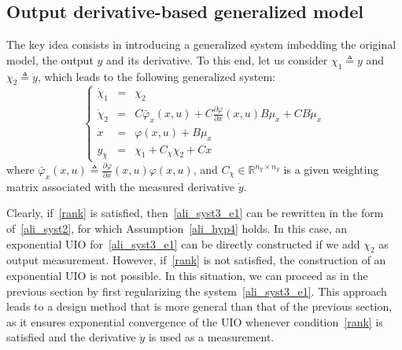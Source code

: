 \subsection{Output derivative-based generalized model}\label{output_derivative_model}
The key idea consists in introducing a generalized system imbedding the original model, the output $y$ and its derivative. To this end, let us consider $\chi_{1} \triangleq y$ and $\chi_{2} \triangleq \dot{y}$, which leads to the following generalized system:
\begin{equation}\label{ali_syst3_e1}
\left\{
\begin{array}{rcl}
\dot{\chi}_{1} & = & \chi_{2} 
\\
\dot{\chi}_{2} & = & C  \bar{\varphi}_{x}(x,u)  + C \frac{\partial \varphi}{\partial x}(x,u) B \mu_{x} + CB \dot{\mu}_{x}
\\ 
\dot{x} & = &  \varphi(x,u) + B \mu_{x} \\
y_{\chi} & = &  \chi_{1} + C_{\chi} \chi_{2} + C x
\end{array}
\right.
\end{equation}
where $\bar{\varphi}_{x}(x,u) \triangleq \frac{\partial \varphi}{\partial x}(x,u) \varphi(x,u)$, and $C_{\chi} \in\mathbb{R}^{n_y\times n_y}$ is a given weighting matrix associated with the measured derivative $\dot{y}$.

Clearly, if~\eqref{rank} is satisfied, then~\eqref{ali_syst3_e1} can be rewritten in the form of~\eqref{ali_syst2}, for which Assumption~\ref{ali_hyp4} holds. In this case, an exponential UIO for~\eqref{ali_syst3_e1} can be directly constructed if we add $\chi_{2}$ as output measurement. However, if~\eqref{rank} is not satisfied, the construction of an exponential UIO is not possible. In this situation, we can proceed as in the previous section by first regularizing the system~\eqref{ali_syst3_e1}. This approach leads to a design method that is more general than that of the previous section, as it ensures exponential convergence of the UIO whenever condition~\eqref{rank} is satisfied and the derivative $\dot{y}$ is used as a measurement.




